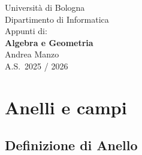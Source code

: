 \documentclass[
  a4paper,
]{article}
\author{}
\date{}
\begin{document}
\hypersetup{pageanchor=false}

\begin{titlepage}
\thispagestyle{empty}
\begin{center}
{\large\textcolor[HTML]{555555}{Università di Bologna}}\\[0.5em]
{\normalsize\textcolor[HTML]{777777}{Dipartimento di Informatica}}\\[6em]

{\normalsize\textcolor[HTML]{555555}{Appunti di:}}\\[0.8em]
{\huge\bfseries Algebra e Geometria}\\[6em]

{\Large Andrea Manzo}\\[1.2em]
{\large A.S.\ 2025 / 2026}\\[6em]
\end{center}
\end{titlepage}

\hypersetup{pageanchor=true}

{
\setcounter{tocdepth}{3}
\tableofcontents
}
\newpage

\hypertarget{anelli-e-campi}{%
\section{Anelli e campi}\label{anelli-e-campi}}

\hypertarget{definizione-di-anello}{%
\subsection{Definizione di Anello}\label{definizione-di-anello}}
\end{document}
